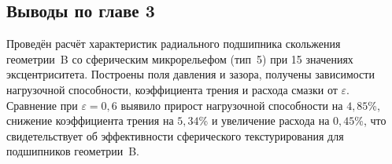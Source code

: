 \subsection*{Выводы по главе 3}
{}

Проведён расчёт характеристик радиального подшипника скольжения геометрии~B со сферическим микрорельефом (тип~5) при 15 значениях эксцентриситета. Построены поля давления и зазора, получены зависимости нагрузочной способности, коэффициента трения и расхода смазки от $\varepsilon$. Сравнение при $\varepsilon = 0{,}6$ выявило прирост нагрузочной способности на $4{,}85$\%, снижение коэффициента трения на $5{,}34$\% и увеличение расхода на $0{,}45$\%, что свидетельствует об эффективности сферического текстурирования для подшипников геометрии~B.
